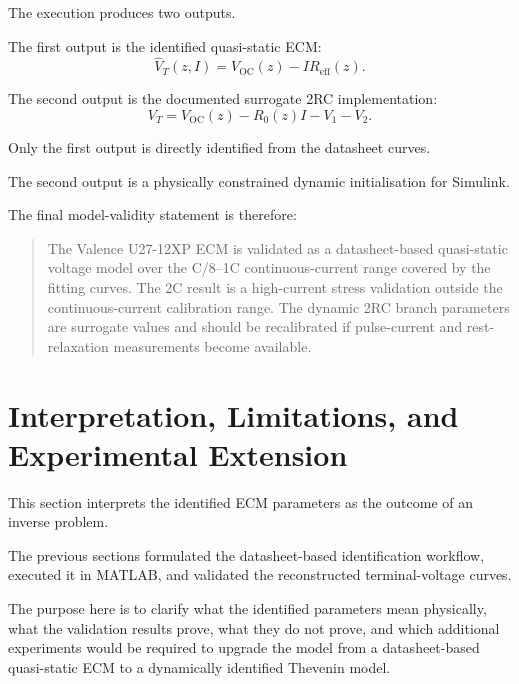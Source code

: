 \documentclass[a4paper,12pt]{article}
\begin{document}
The execution produces two outputs.

The first output is the identified quasi-static ECM:
\begin{equation}
\boxed{
\hat{V}_T(z,I)
=
V_{\mathrm{OC}}(z)
-
IR_{\mathrm{eff}}(z).
}
\label{eq:exec_final_static_output}
\end{equation}

The second output is the documented surrogate 2RC implementation:
\begin{equation}
\boxed{
V_T
=
V_{\mathrm{OC}}(z)
-
R_0(z)I
-
V_1
-
V_2.
}
\label{eq:exec_final_dynamic_output}
\end{equation}

Only the first output is directly identified from the datasheet curves.

The second output is a physically constrained dynamic initialisation for Simulink.

The final model-validity statement is therefore:

\begin{quote}
The Valence U27-12XP ECM is validated as a datasheet-based quasi-static voltage model over the C/8--1C continuous-current range covered by the fitting curves.
The 2C result is a high-current stress validation outside the continuous-current calibration range.
The dynamic 2RC branch parameters are surrogate values and should be recalibrated if pulse-current and rest-relaxation measurements become available.
\end{quote}

\clearpage
\newpage
\section{Interpretation, Limitations, and Experimental Extension}
\label{sec:interpretation_limitations_extension}

This section interprets the identified ECM parameters as the outcome of an inverse problem.

The previous sections formulated the datasheet-based identification workflow, executed it in MATLAB, and validated the reconstructed terminal-voltage curves.

The purpose here is to clarify what the identified parameters mean physically, what the validation results prove, what they do not prove, and which additional experiments would be required to upgrade the model from a datasheet-based quasi-static ECM to a dynamically identified Thevenin model.
\end{document}

